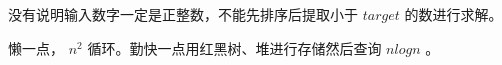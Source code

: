 没有说明输入数字一定是正整数，不能先排序后提取小于 $ target $ 的数进行求解。\par

懒一点， $ n^{2} $ 循环。勤快一点用红黑树、堆进行存储然后查询 $ nlogn $ 。\par
